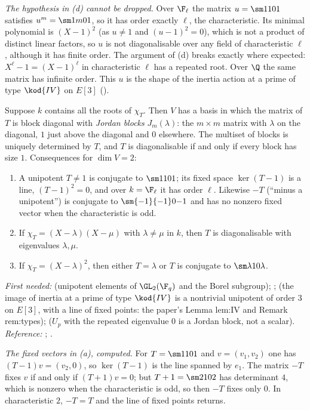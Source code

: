 \emph{The hypothesis in (d) cannot be dropped.} Over $\F_\ell$ the matrix $u=\sm1101$ satisfies
$u^m=\sm1m01$, so it has order exactly $\ell$, the characteristic. Its minimal polynomial is
$(X-1)^2$ (as $u\ne1$ and $(u-1)^2=0$), which is not a product of distinct linear factors, so $u$ is
not diagonalisable over any field of characteristic $\ell$, although it has finite order. The
argument of (d) breaks exactly where expected: $X^\ell-1=(X-1)^\ell$ in characteristic $\ell$ has a
repeated root. Over $\Q$ the same matrix has infinite order. This $u$ is the shape of the inertia
action at a prime of type $\kod{IV}$ on $E[3]$ ().

\begin{theorem}\label{thm:prereq:jordan}
Suppose $k$ contains all the roots of $\chi_T$. Then $V$ has a basis in which the matrix of $T$ is
block diagonal with \emph{Jordan blocks} $J_m(\lambda)$: the $m\times m$ matrix with $\lambda$ on
the diagonal, $1$ just above the diagonal and $0$ elsewhere. The multiset of blocks is uniquely
determined by $T$, and $T$ is diagonalisable if and only if every block has size $1$. Consequences
for $\dim V=2$:
\begin{enumerate}[label=(\alph*)]
\item A unipotent $T\ne1$ is conjugate to $\sm1101$; its fixed space $\ker(T-1)$ is a line,
$(T-1)^2=0$, and over $k=\F_\ell$ it has order $\ell$. Likewise $-T$ (``minus a unipotent'') is
conjugate to $\sm{-1}{-1}0{-1}$ and has no nonzero fixed vector when the characteristic is odd.
\item If $\chi_T=(X-\lambda)(X-\mu)$ with $\lambda\ne\mu$ in $k$, then $T$ is diagonalisable with
eigenvalues $\lambda,\mu$.
\item If $\chi_T=(X-\lambda)^2$, then either $T=\lambda$ or $T$ is conjugate to $\sm\lambda10\lambda$.
\end{enumerate}
\end{theorem}
\noindent\emph{First needed:}  (unipotent elements of $\GL_2(\F_q)$ and the Borel
subgroup); ;  (the image of inertia at a prime of type $\kod{IV}$ is
a nontrivial unipotent of order $3$ on $E[3]$, with a line of fixed points: the paper's Lemma
lem:IV and Remark rem:types);  ($U_p$ with the repeated eigenvalue $0$ is a Jordan
block, not a scalar). \emph{Reference:} \cite[Chapter 8]{Axler15}; \cite[Section 12.3]{DummitFoote}.

\emph{The fixed vectors in (a), computed.} For $T=\sm1101$ and $v=(v_1,v_2)$ one has
$(T-1)v=(v_2,0)$, so $\ker(T-1)$ is the line spanned by $e_1$. The matrix $-T$ fixes $v$ if and only
if $(T+1)v=0$; but $T+1=\sm2102$ has determinant $4$, which is nonzero when the characteristic is
odd, so then $-T$ fixes only $0$. In characteristic $2$, $-T=T$ and the line of fixed points
returns.

